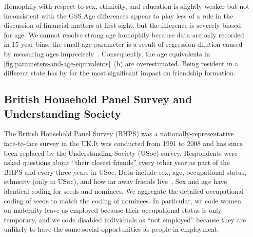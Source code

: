 \documentclass{scrartcl}
\newcommand{\titlecaption}[2]{\caption[#1]{\emph{#1} #2}}
\begin{document}
Homophily with respect to sex, ethnicity, and education is slightly weaker but not inconsistent with the GSS.\@ Age differences appear to play less of a role in the discussion of financial matters at first sight, but the inference is severely biased for age. We cannot resolve strong age homophily because data are only recorded in 15-year bins: the small age parameter is a result of regression dilution caused by measuring ages imprecisely~\cite{Hutcheon2010}. Consequently, the age equivalents in \cref{fig:parameters-and-age-equivalents}~(b) are overestimated. Being resident in a different state has by far the most significant impact on friendship formation.

\subsection{British Household Panel Survey and Understanding Society\label{sec:survey-bhps-usoc}}

The British Household Panel Survey (BHPS) was a nationally-representative face-to-face survey in the UK.\@ It was conducted from 1991 to 2008 and has since been replaced by the Understanding Society (USoc) survey. Respondents were asked questions about ``their closest friends'' every other year as part of the BHPS and every three years in USoc. Data include sex, age, occupational status, ethnicity (only in USoc), and how far away friends live~\cite{Institute-for-Social-and-Economic-Research2000,Institute-for-Social-and-Economic-Research2017}. Sex and age have identical coding for seeds and nominees. We aggregate the detailed occupational coding of seeds to match the coding of nominees. In particular, we code women on maternity leave as employed because their occupational status is only temporary, and we code disabled individuals as ``not employed'' because they are unlikely to have the same social opportunities as people in employment.

\end{document}
